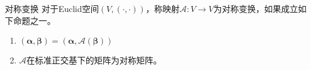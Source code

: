 \documentclass[lang = cn, scheme = chinese, thmcnt = section]{elegantbook}
\newcommand{\bs}{\boldsymbol}          %
\begin{document}
\begin{definition}{对称变换}
	对于Euclid空间$(V,(\cdot,\cdot))$，称映射$\mathscr{A}:V\to V$为对称变换，如果成立如下命题之一。
	\begin{enumerate}
		\item $(\mathscr{\bs{\alpha}},\bs{\beta})=(\bs{\alpha},\mathscr{A}(\bs{\beta}))$
		\item $\mathscr{A}$在标准正交基下的矩阵为对称矩阵。
	\end{enumerate}
\end{definition}




















































	
\end{document}
